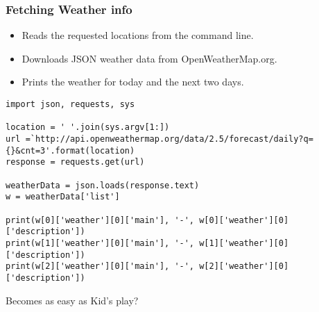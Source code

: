 \begin{frame}[fragile]\frametitle{Fetching Weather info}
\begin{itemize}
\item Reads the requested locations from the command line.
\item Downloads JSON weather data from OpenWeatherMap.org.
\item Prints the weather for today and the next two days.
\end{itemize}
\begin{lstlisting}
import json, requests, sys

location = ' '.join(sys.argv[1:])
url =`http://api.openweathermap.org/data/2.5/forecast/daily?q={}&cnt=3'.format(location)
response = requests.get(url)

weatherData = json.loads(response.text)
w = weatherData['list']

print(w[0]['weather'][0]['main'], '-', w[0]['weather'][0]['description'])
print(w[1]['weather'][0]['main'], '-', w[1]['weather'][0]['description'])
print(w[2]['weather'][0]['main'], '-', w[2]['weather'][0]['description'])
\end{lstlisting}
Becomes as easy as Kid's play?
\end{frame}

